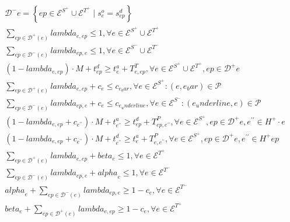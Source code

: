 \begin{align}
  & \mathcal{D}^{-} e = \left\{ep \in \mathcal{E}^{S^{+}} \cup \mathcal{E}^{T^{+}} \mid s_{e}^{o} = s_{ep}^{d}\right\} \tag{eq\_0015} \\
  & \sum_{ep \in \mathcal{D}^{+} \left(e\right)} \mathit{lambda}_{e , ep} \leq 1 , \forall e \in \mathcal{E}^{S^{+}} \cup \mathcal{E}^{T^{+}} \tag{eq\_0016} \\
  & \sum_{ep \in \mathcal{D}^{-} \left(e\right)} \mathit{lambda}_{ep , e} \leq 1 , \forall e \in \mathcal{E}^{S^{-}} \cup \mathcal{E}^{T^{-}} \tag{eq\_0018} \\
  & \left(1 - \mathit{lambda}_{e , ep}\right) \cdot M + t_{ep}^{d} \geq t_{e}^{a} + T_{e , ep}^{T} , \forall e \in \mathcal{E}^{S^{+}} \cup \mathcal{E}^{T^{+}} , ep \in \mathcal{D}^{+} e \tag{eq\_0019} \\
  & \sum_{ep \in \mathcal{D}^{+} \left(e\right)} \mathit{lambda}_{e , ep} + c_{e} \leq c_{e_bar} , \forall e \in \mathcal{E}^{S^{+}} : \left(e , e_bar\right) \in \mathcal{P} \tag{eq\_0020} \\
  & \sum_{ep \in \mathcal{D}^{-} \left(e\right)} \mathit{lambda}_{ep , e} + c_{e} \leq c_{e_underline} , \forall e \in \mathcal{E}^{S^{-}} : \left(e_underline , e\right) \in \mathcal{P} \tag{eq\_0022} \\
  & \left(1 - \mathit{lambda}_{e , ep} + c_{e^{' '}}\right) \cdot M + t_{e^{' '}}^{a} \geq t_{ep}^{d} + T_{ep , e^{' '}}^{P} , \forall e \in \mathcal{E}^{S^{+}} , ep \in \mathcal{D}^{+} e , e^{' '} \in H^{+} \cdot e \tag{eq\_0023} \\
  & \left(1 - \mathit{lambda}_{e , ep} + c_{e^{' '}}\right) \cdot M + t_{e^{' '}}^{d} \geq t_{e}^{a} + T_{e , e^{' '}}^{P} , \forall e \in \mathcal{E}^{S^{+}} , ep \in \mathcal{D}^{+} e , e^{' '} \in H^{+} ep \tag{eq\_0025} \\
  & \sum_{ep \in \mathcal{D}^{+} \left(e\right)} \mathit{lambda}_{e , ep} + \mathit{beta}_{e} \leq 1 , \forall e \in \mathcal{E}^{T^{+}} \tag{eq\_0029} \\
  & \sum_{ep \in \mathcal{D}^{-} \left(e\right)} \mathit{lambda}_{ep , e} + \mathit{alpha}_{e} \leq 1 , \forall e \in \mathcal{E}^{T^{-}} \tag{eq\_0031} \\
  & \mathit{alpha}_{e} + \sum_{ep \in \mathcal{D}^{-} \left(e\right)} \mathit{lambda}_{ep , e} \geq 1 - c_{e} , \forall e \in \mathcal{E}^{T^{-}} \tag{eq\_0032} \\
  & \mathit{beta}_{e} + \sum_{ep \in \mathcal{D}^{+} \left(e\right)} \mathit{lambda}_{e , ep} \geq 1 - c_{e} , \forall e \in \mathcal{E}^{T^{+}} \tag{eq\_0034} \\

\end{align}
